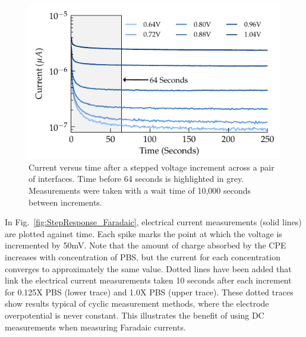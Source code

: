 \documentclass[journal, a4paper]{IEEEtran}
\begin{document}
\begin{figure}
    \begin{center}
        \includegraphics{graphics/CPE_currentVsTime}
    \end{center}
    \caption{Current versus time after a stepped voltage increment across a pair of interfaces. Time before 64 seconds is highlighted in grey. Measurements were taken with a wait time of 10,000 seconds between increments.}
    \label{fig:CPE_currentVsTime}
\end{figure}

In Fig.~\ref{fig:StepResponse_Faradaic}, electrical current measurements (solid lines) are plotted against time. Each spike marks the point at which the voltage is incremented by 50\thinspace mV. Note that the amount of charge absorbed by the CPE increases with concentration of PBS, but the current for each concentration converges to approximately the same value. Dotted lines have been added that link the electrical current measurements taken 10 seconds after each increment for 0.125X PBS (lower trace) and 1.0X PBS (upper trace). These dotted traces show results typical of cyclic measurement methods, where the electrode overpotential is never constant. This illustrates the benefit of using DC measurements when measuring Faradaic currents.
\end{document}
